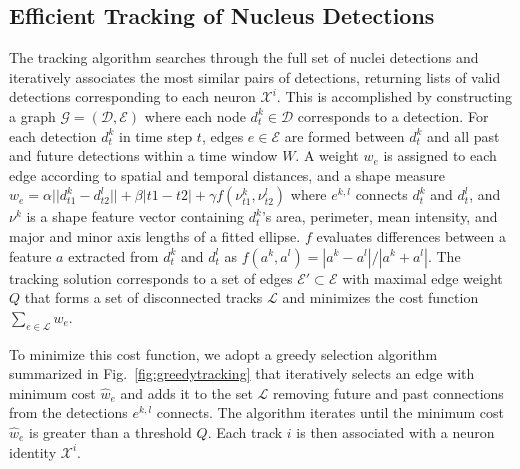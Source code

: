 \vspace{-3mm}
\subsection{Efficient Tracking of Nucleus Detections}
\label{sec:tracking}
\vspace{-2mm}

The tracking  algorithm searches through the  full set of  nuclei detections and
iteratively associates the most similar  pairs of detections, returning lists of
valid  detections  corresponding  to   each  neuron  $\mathcal{X}^i$.   This  is
accomplished  by  constructing  a graph  $\mathcal{G}=(\mathcal{D},\mathcal{E})$
where each  node $d^k_t \in \mathcal{D}$  corresponds to a  detection.  For each
detection $d^k_t$ in time step $t$, edges $e \in \mathcal{E}$ are formed between
$d^k_t$ and all  past and future detections within a time  window $W$.  A weight
$w_e$ is assigned to each edge  according to spatial and temporal distances, and
a shape measure  $w_{e} = \alpha || d^k_{t1}  - d^l_{t2} || + \beta |t1  - t2| +
\gamma f(\nu^k_{t1}, \nu^l_{t2})$ where  $e^{k,l}$ connects $d^k_t$ and $d^l_t$,
and $\nu^k$ is a shape feature vector containing $d^k_t$'s area, perimeter, mean
intensity, and major  and minor axis lengths of a  fitted ellipse. $f$ evaluates
differences  between  a  feature  $a$  extracted from  $d^k_t$  and  $d^l_t$  as
$f(a^k,a^l) = {|a^k  - a^l|}/{|a^k + a^l|}$. %
The  tracking solution  corresponds  to  a set  of  edges $\mathcal{E'}  \subset
\mathcal{E}$  with maximal  edge weight  $Q$ that  forms a  set  of disconnected
tracks $\mathcal{L}$  and minimizes the cost function  $\sum_{e \in \mathcal{L}}
w_e$.

To minimize this cost function, we adopt a greedy selection algorithm
summarized  in Fig.~\ref{fig:greedytracking}  that iteratively  selects  an edge
with minimum  cost $\hat w_e$  and adds it  to the set %
 $\mathcal{L}$ removing
future  and  past  connections  from  the  detections  $e^{k,l}$  connects.  The
algorithm iterates until the minimum cost $\hat w_e$ is greater than a threshold
$Q$. %
 Each track $i$ is then associated with a neuron identity $\mathcal{X}^i$.



